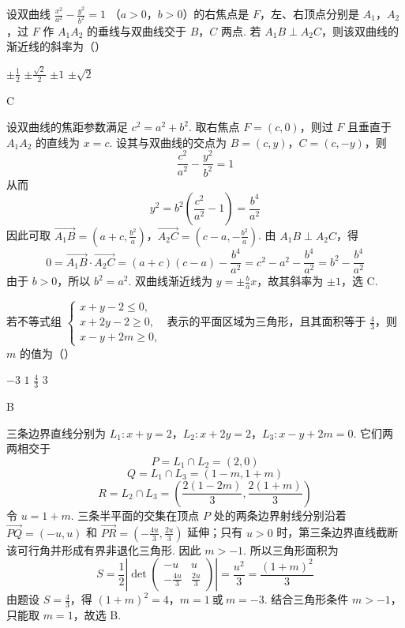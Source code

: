 \begin{problem}
设双曲线 \(\frac{x^2}{a^2} - \frac{y^2}{b^2} = 1 \) （\(a > 0\)，\(b > 0\)）的右焦点是 \(F\)，左、右顶点分别是 \(A_1\)，\(A_2\)，过 \(F\) 作 \(A_1A_2\) 的垂线与双曲线交于 \(B\)，\(C\) 两点. 若 \(A_1B \perp A_2C\)，则该双曲线的渐近线的斜率为（\quad）

\choices
    {\(\pm \frac{1}{2}\)}
    {\(\pm \frac{\sqrt{2}}{2}\)}
    {\(\pm 1\)}
    {\(\pm \sqrt{2}\)}
\end{problem}

\begin{answer}
C
\end{answer}

\begin{solution}
设双曲线的焦距参数满足 \(c^{2}=a^{2}+b^{2}\). 取右焦点 \(F=(c,0)\)，则过 \(F\) 且垂直于 \(A_{1}A_{2}\) 的直线为 \(x=c\). 设其与双曲线的交点为 \(B=(c,y)\)，\(C=(c,-y)\)，则
\[
\frac{c^{2}}{a^{2}}-\frac{y^{2}}{b^{2}}=1
\]
从而
\[
y^{2}=b^{2}\left(\frac{c^{2}}{a^{2}}-1\right)=\frac{b^{4}}{a^{2}}
\]
因此可取
\(\overrightarrow{A_{1}B}=\left(a+c,\frac{b^{2}}a\right)\)，\(\overrightarrow{A_{2}C}=\left(c-a,-\frac{b^{2}}a\right)\).
由 \(A_{1}B\perp A_{2}C\)，得
\[
0=\overrightarrow{A_{1}B}\cdot\overrightarrow{A_{2}C}
=(a+c)(c-a)-\frac{b^{4}}{a^{2}}
=c^{2}-a^{2}-\frac{b^{4}}{a^{2}}
=b^{2}-\frac{b^{4}}{a^{2}}
\]
由于 \(b>0\)，所以 \(b^{2}=a^{2}\). 双曲线渐近线为 \(y=\pm\frac ba x\)，故其斜率为 \(\pm1\)，选 C.
\end{solution}

\begin{problem}
若不等式组
\(
\begin{cases}
x + y - 2 \leqslant 0,\\
x + 2y - 2 \geqslant 0,\\
x - y + 2m \geqslant 0,
\end{cases}
\)
表示的平面区域为三角形，且其面积等于 \(\frac{4}{3}\)，则 \(m\) 的值为（\quad）

\choices
    {\(-3\)}
    {\(1\)}
    {\(\frac{4}{3}\)}
    {\(3\)}
\end{problem}

\begin{answer}
B
\end{answer}

\begin{solution}
三条边界直线分别为
\(L_{1}:x+y=2\)，\(L_{2}:x+2y=2\)，\(L_{3}:x-y+2m=0\).
它们两两相交于
\[
P=L_{1}\cap L_{2}=(2,0)
\]
\[
Q=L_{1}\cap L_{3}=(1-m,1+m)
\]
\[
R=L_{2}\cap L_{3}=\left(\frac{2(1-2m)}3,\frac{2(1+m)}3\right)
\]
令 \(u=1+m\). 三条半平面的交集在顶点 \(P\) 处的两条边界射线分别沿着 \(\overrightarrow{PQ}=(-u,u)\) 和 \(\overrightarrow{PR}=\left(-\frac{4u}{3},\frac{2u}{3}\right)\) 延伸；只有 \(u>0\) 时，第三条边界直线截断该可行角并形成有界非退化三角形. 因此 \(m>-1\).
所以三角形面积为
\[
S=\frac12\left|\det\begin{pmatrix}-u&u\\-\frac{4u}{3}&\frac{2u}{3}\end{pmatrix}\right|
=\frac{u^{2}}3=\frac{(1+m)^{2}}3
\]
由题设 \(S=\frac43\)，得
\((1+m)^{2}=4\)，\(m=1\ \text{或}\ m=-3\).
结合三角形条件 \(m>-1\)，只能取 \(m=1\)，故选 B.
\end{solution}

